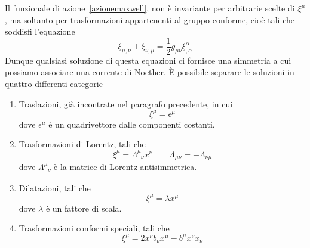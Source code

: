     Il funzionale di azione~\eqref{azionemaxwell}, non è invariante per arbitrarie scelte di $\xi^\mu$, ma soltanto per trasformazioni appartenenti al gruppo conforme, cioè tali che soddisfi l'equazione
\begin{equation}\label{conforme}
    \xi_{\mu,\nu} + \xi_{\nu,\mu} = \frac{1}{2} g_{\mu\nu} \xi^\alpha_{,\alpha}
\end{equation} 
    Dunque qualsiasi soluzione di questa equazioni ci fornisce una simmetria a cui possiamo associare una corrente di Noether. È possibile separare le soluzioni in quattro differenti categorie 
\begin{enumerate}
    \item Traslazioni, già incontrate nel paragrafo precedente, in cui
\begin{equation*}
    \xi^\mu = \epsilon^\mu
\end{equation*}
    dove $\epsilon^\mu$ è un quadrivettore dalle componenti costanti.
    \item Trasformazioni di Lorentz, tali che 
\begin{equation*}
    \xi^\mu = \Lambda^\mu_{\phantom \mu \nu} x^\nu \qquad \Lambda_{\mu\nu} = - \Lambda_{\nu\mu}
\end{equation*}
    dove $\Lambda^\mu_{\phantom \mu \nu}$ è la matrice di Lorentz antisimmetrica.
    \item Dilatazioni, tali che
\begin{equation*}
    \xi^\mu = \lambda x^\mu
\end{equation*}
    dove $\lambda$ è un fattore di scala.
    \item Trasformazioni conformi speciali, tali che
\begin{equation*}
    \xi^\mu = 2 x^\nu b_\nu x^\mu - b^\mu x^\nu x_\nu
\end{equation*}
\end{enumerate}

